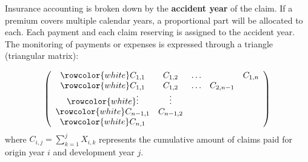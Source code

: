 \begin{f}
	
	Insurance accounting is broken down by the \textbf{accident year} of the claim. 
	If a premium covers multiple calendar years, a proportional part will be allocated to each.
	Each payment and each claim reserving is assigned to the accident year. 
	The monitoring of payments or expenses is expressed through a triangle (triangular matrix):
	
	$$
	\left(\begin{array}{ccccc}
		\rowcolor{white}	C_{1,1} & C_{1,2} & \ldots & & C_{1, n} \\
		\rowcolor{white}	C_{1,1} & C_{1,2} & \ldots & C_{2, n-1} \\
		\rowcolor{white}	\vdots & \vdots & & \\
		\rowcolor{white}	C_{n-1,1} & C_{n-1,2} & & \\
		\rowcolor{white}	C_{n, 1} & & &
	\end{array}\right)
	$$
	where $C_{i, j}=\sum_{k=1}^{j} X_{i, k}$ represents the cumulative amount of claims paid for origin year $i$ and development year $j$.
	
\end{f}


